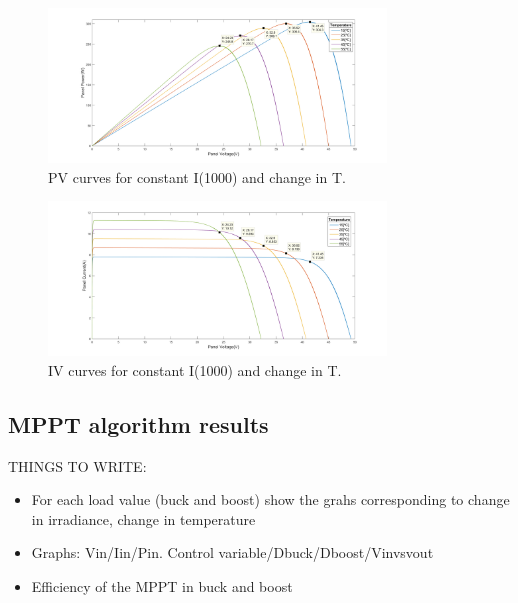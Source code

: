 \begin{figure}[H]
	\begin{center}
		\includegraphics[width=0.8\textwidth]{../Pictures/PV_curves_1000_irradiance}
		\caption{PV curves for constant I(1000) and change in T.}
		\label{fig:PVcurves_Irr1000} 
	\end{center}	
\end{figure}


\begin{figure}[H]
	\begin{center}
		\includegraphics[width=0.8\textwidth]{../Pictures/IV_curves_1000_irradiance}
		\caption{IV curves for constant I(1000) and change in T.}
		\label{fig:IVcurves_Irr1000} 
	\end{center}	
\end{figure}



\subsection{MPPT algorithm results}

THINGS TO WRITE:
\begin{itemize}
	\item For each load value (buck and boost) show the grahs corresponding to change in irradiance, change in temperature 
	\item Graphs: Vin/Iin/Pin. Control variable/Dbuck/Dboost/Vinvsvout
	\item Efficiency of the MPPT in buck and boost
	
\end{itemize}
